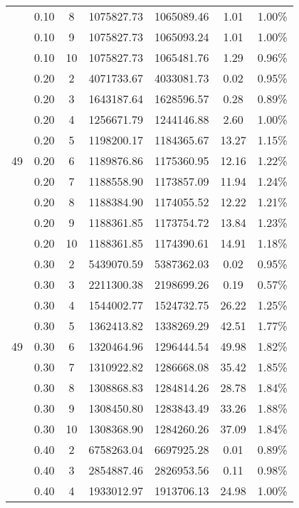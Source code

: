 {\begin{longtable}{cccrrcc}
        & 0.10  & 8     & 1075827.73 & 1065089.46 & 1.01  & 1.00\% \\
        & 0.10  & 9     & 1075827.73 & 1065093.24 & 1.01  & 1.00\% \\
        & 0.10  & 10    & 1075827.73 & 1065481.76 & 1.29  & 0.96\% \\
        & 0.20  & 2     & 4071733.67 & 4033081.73 & 0.02  & 0.95\% \\
        & 0.20  & 3     & 1643187.64 & 1628596.57 & 0.28  & 0.89\% \\
        & 0.20  & 4     & 1256671.79 & 1244146.88 & 2.60  & 1.00\% \\
        & 0.20  & 5     & 1198200.17 & 1184365.67 & 13.27 & 1.15\% \\
  49    & 0.20  & 6     & 1189876.86 & 1175360.95 & 12.16 & 1.22\% \\
        & 0.20  & 7     & 1188558.90 & 1173857.09 & 11.94 & 1.24\% \\
        & 0.20  & 8     & 1188384.90 & 1174055.52 & 12.22 & 1.21\% \\
        & 0.20  & 9     & 1188361.85 & 1173754.72 & 13.84 & 1.23\% \\
        & 0.20  & 10    & 1188361.85 & 1174390.61 & 14.91 & 1.18\% \\
        & 0.30  & 2     & 5439070.59 & 5387362.03 & 0.02  & 0.95\% \\
        & 0.30  & 3     & 2211300.38 & 2198699.26 & 0.19  & 0.57\% \\
        & 0.30  & 4     & 1544002.77 & 1524732.75 & 26.22 & 1.25\% \\
        & 0.30  & 5     & 1362413.82 & 1338269.29 & 42.51 & 1.77\% \\
  49    & 0.30  & 6     & 1320464.96 & 1296444.54 & 49.98 & 1.82\% \\
        & 0.30  & 7     & 1310922.82 & 1286668.08 & 35.42 & 1.85\% \\
        & 0.30  & 8     & 1308868.83 & 1284814.26 & 28.78 & 1.84\% \\
        & 0.30  & 9     & 1308450.80 & 1283843.49 & 33.26 & 1.88\% \\
        & 0.30  & 10    & 1308368.90 & 1284260.26 & 37.09 & 1.84\% \\
        & 0.40  & 2     & 6758263.04 & 6697925.28 & 0.01  & 0.89\% \\
        & 0.40  & 3     & 2854887.46 & 2826953.56 & 0.11  & 0.98\% \\
        & 0.40  & 4     & 1933012.97 & 1913706.13 & 24.98 & 1.00\% \\

\end{longtable}}
